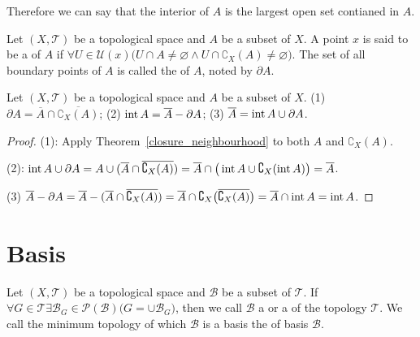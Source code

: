 \documentclass[openany]{book}
\begin{document}
Therefore we can say that the interior of $A$ is the largest open set contianed in $A$.

\begin{definition}
	Let $(X,\mathscr T)$ be a topological space and $A$ be a subset of $X$. 
	A point $x$ is said to be a  of $A$ if 
	$\forall U\in \mathscr U(x)\big(
		U\cap A\neq \varnothing \wedge U\cap \complement_X(A)\neq \varnothing\big)$.
	The set of all boundary points of $A$ is called the  of $A$, noted by $\partial A$.
\end{definition}

\begin{theorem}\label{boundary_propoties}
Let $(X,\mathscr T)$ be a topological space and $A$ be a subset of $X$. 
(1) $\partial A = \overline A \cap \overline{\complement_X(A)}$;
(2) $\operatorname{int} A = \overline A - \partial A$;
(3) $\overline A = \operatorname{int} A\cup \partial A$.
\end{theorem}
\begin{proof}
(1): Apply Theorem~\ref{closure_neighbourhood} to both $A$ and $\complement_X(A)$.

(2): $\operatorname{int} A \cup \partial A=
	A\cup(\overline A\cap \overline{\complement_X (A)})=
		\overline A\cap \big(\operatorname{int} A\cup \complement_X (\operatorname{int} A)\big) = \overline A$.
		
(3) $\overline A -\partial A= 
	\overline A - (\overline A\cap \overline{\complement_X (A)}) = 
		\overline A \cap \complement_X\big(
			\overline{
				\complement_X(A)}\big) = 
			\overline A\cap \operatorname{int} A = 
				\operatorname{int} A$.
\end{proof}

\section{Basis}
\begin{definition}[Basis]
Let $(X,\mathscr T)$ be a topological space and $\mathscr B$ be a subset of $\mathscr T$.
If $\forall G\in \mathscr T 
	\exists \mathscr B_G\in \mathscr P(\mathscr B) \big(
		G=\cup \mathscr B_G\big)$, 
then we call $\mathscr B$ a  or a  of the topology $\mathscr T$.
We call the minimum topology of which $\mathscr B$ is a basis the  of basis $\mathscr B$.
\end{definition}
\end{document}
